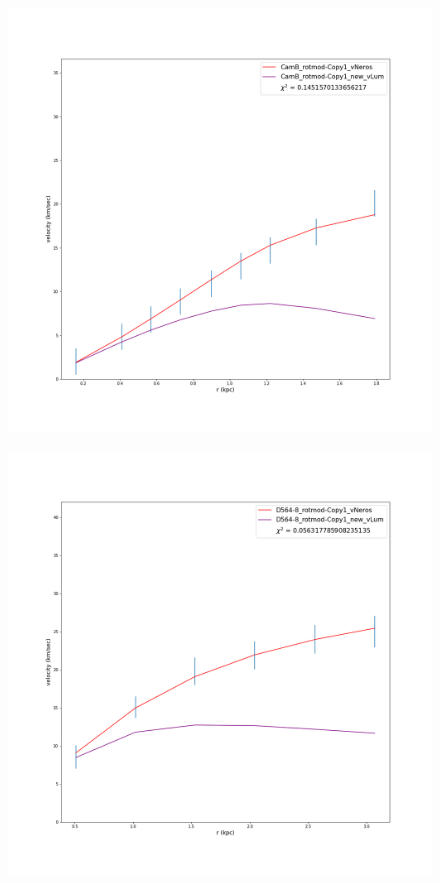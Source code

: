 \documentclass[reprint,%
 amsmath,amssymb,
 aps,
]{revtex4-1}
\begin{document}
 

\begin{figure}
\centering
\begin{minipage}{.5\textwidth}
  \centering
  \includegraphics[width=.95\linewidth]{Updated_Graphs_withnewcolorsandfonts/CamB_rotmod-Copy1_XueSofue.png}
  \label{fig:test1}
\end{minipage}%
\begin{minipage}{.5\textwidth}
  \centering
  \includegraphics[width=.95\linewidth]{Updated_Graphs_withnewcolorsandfonts/D564-8_rotmod-Copy1_XueSofue.png}

\end{minipage}
\end{figure}
\end{document}
